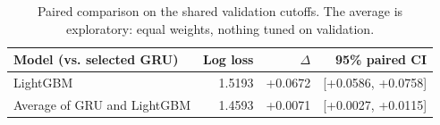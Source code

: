 \begin{table}[htbp]
\centering\small
\begin{tabular}{@{}lrrr@{}}
\toprule
Model (vs. selected GRU) & Log loss & $\Delta$ & 95\% paired CI \\
\midrule
LightGBM & 1.5193 & +0.0672 & [+0.0586, +0.0758] \\
Average of GRU and LightGBM & 1.4593 & +0.0071 & [+0.0027, +0.0115] \\
\bottomrule
\end{tabular}
\caption{Paired comparison on the shared validation cutoffs. The average is exploratory: equal weights, nothing tuned on validation.}
\end{table}

